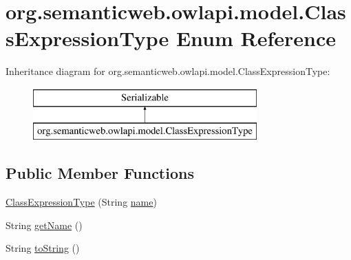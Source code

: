 \hypertarget{enumorg_1_1semanticweb_1_1owlapi_1_1model_1_1_class_expression_type}{\section{org.\-semanticweb.\-owlapi.\-model.\-Class\-Expression\-Type Enum Reference}
\label{enumorg_1_1semanticweb_1_1owlapi_1_1model_1_1_class_expression_type}
}
Inheritance diagram for org.\-semanticweb.\-owlapi.\-model.\-Class\-Expression\-Type\-:\begin{figure}[H]
\begin{center}
\leavevmode
\includegraphics[height=2.000000cm]{enumorg_1_1semanticweb_1_1owlapi_1_1model_1_1_class_expression_type}
\end{center}
\end{figure}
\subsection*{Public Member Functions}
\begin{DoxyCompactItemize}
\item 
\hyperlink{enumorg_1_1semanticweb_1_1owlapi_1_1model_1_1_class_expression_type_a10e87c12cbd62dc8f5ed87885270bc59}{Class\-Expression\-Type} (String \hyperlink{enumorg_1_1semanticweb_1_1owlapi_1_1model_1_1_class_expression_type_a1900aae805cc71bf29700bb22df386a6}{name})
\item 
String \hyperlink{enumorg_1_1semanticweb_1_1owlapi_1_1model_1_1_class_expression_type_a96bb9c2c5c62aa89e897b8f442f7ee67}{get\-Name} ()
\item 
String \hyperlink{enumorg_1_1semanticweb_1_1owlapi_1_1model_1_1_class_expression_type_a23fcd5d5a638850138083f02b7634804}{to\-String} ()
\end{DoxyCompactItemize}
